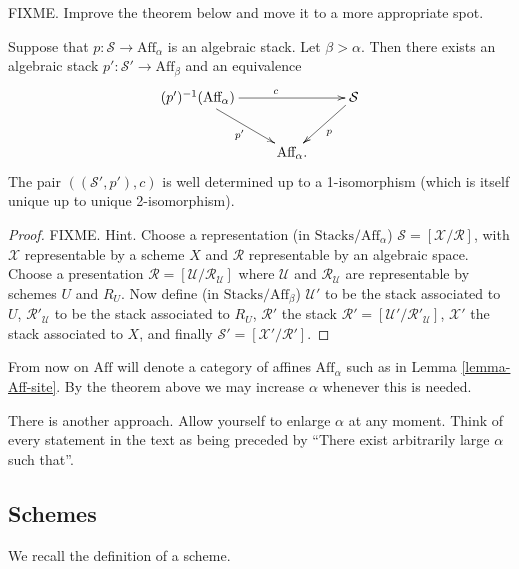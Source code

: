 \smallskip\noindent
FIXME. Improve the theorem below and move it to a more appropriate spot.

\begin{theorem}
\label{theorem-change-alpha}
Suppose that $p : \mathcal{S} \to \text{Aff}_\alpha$ is an algebraic stack.
Let $\beta > \alpha$. Then there exists an algebraic stack
$p' : \mathcal{S}' \to \text{Aff}_\beta$ and an equivalence
$$
\xymatrix{
(p')^{-1}(\text{Aff}_\alpha) \ar[rd]_{p'} \ar[rr]^c && \mathcal{S}\ar[ld]^p\\
&\text{Aff}_\alpha.&}
$$
The pair $((\mathcal{S'},p'),c)$ is well determined up to a 1-isomorphism
(which is itself unique up to unique 2-isomorphism).
\end{theorem}

\begin{proof}
FIXME. Hint. Choose a representation (in $\text{Stacks}/\text{Aff}_\alpha$)
$\mathcal{S} = [ \mathcal{X}/\mathcal{R} ]$, with $\mathcal{X}$ representable
by a scheme $X$ and $\mathcal{R}$ representable by an algebraic space.
Choose a presentation $\mathcal{R} = [ \mathcal{U}/\mathcal{R}_\mathcal{U} ]$
where $\mathcal{U}$ and $\mathcal{R}_\mathcal{U}$ are representable
by schemes $U$ and $R_U$. Now define (in $\text{Stacks}/\text{Aff}_\beta$)
$\mathcal{U}'$ to be the stack associated to $U$, $\mathcal{R}'_\mathcal{U}$
to be the stack associated to $R_U$, $\mathcal{R}'$ the stack
$\mathcal{R}' = [ \mathcal{U}'/\mathcal{R}'_\mathcal{U} ]$, $\mathcal{X}'$
the stack associated to $X$, and finally
$\mathcal{S}' = [ \mathcal{X}'/\mathcal{R}' ]$.
\end{proof}

\noindent
From now on $\text{Aff}$ will denote a category of affines $\text{Aff}_\alpha$
such as in Lemma \ref{lemma-Aff-site}. By the theorem above we may increase
$\alpha$ whenever this is needed.

\begin{remark}
\label{remark-other-approach}
There is another approach. Allow yourself to enlarge $\alpha$ at any moment.
Think of every statement in the text as being preceded by ``There exist
arbitrarily large $\alpha$ such that''. 
\end{remark}

\subsection{Schemes}
\label{subsection-schemes}

\noindent
We recall the definition of a scheme.

